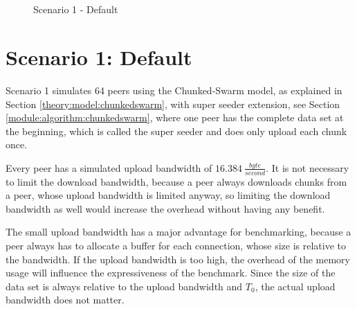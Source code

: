 \begin{figure}[!ht]
	\begin{center}	
		~ %

	 	~ %

		\caption{Scenario 1 - Default}
		\label{fig:s1}
	\end{center}
\end{figure}


\section{Scenario 1: Default}
\label{evaluation:1}

Scenario 1 simulates 64 peers using the Chunked-Swarm model, as explained in Section \ref{theory:model:chunkedswarm}, with super seeder extension, see Section \ref{module:algorithm:chunkedswarm}, where one peer has the complete data set at the beginning, which is called the super seeder and does only upload each chunk once. 

Every peer has a simulated upload bandwidth of $16.384\:\frac{byte}{second}$. It is not necessary to limit the download bandwidth, because a peer always downloads chunks from a peer, whose upload bandwidth is limited anyway, so limiting the download bandwidth as well would increase the overhead without having any benefit. 

The small upload bandwidth has a major advantage for benchmarking, because a peer always has to allocate a buffer for each connection, whose size is relative to the bandwidth. If the upload bandwidth is too high, the overhead of the memory usage will influence the expressiveness of the benchmark. Since the size of the data set is always relative to the upload bandwidth and $T_0$, the actual upload bandwidth does not matter. 

